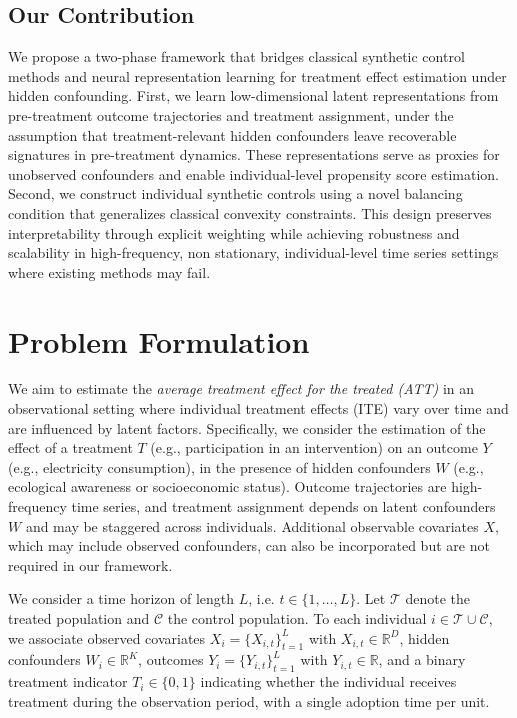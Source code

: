 \documentclass[10pt]{article} %
\begin{document}
\subsection{Our Contribution}
We propose a two-phase framework that bridges classical synthetic control methods and neural representation learning for treatment effect estimation under hidden confounding. First, we learn low-dimensional latent representations from pre-treatment outcome trajectories and treatment assignment, {under the assumption that treatment-relevant hidden confounders leave recoverable signatures in pre-treatment dynamics}. These representations serve as proxies for unobserved confounders and enable individual-level propensity score estimation. Second, we construct individual synthetic controls using a novel balancing condition that generalizes classical convexity constraints. This design preserves interpretability through explicit weighting while achieving robustness and scalability in high-frequency, non stationary, individual-level time series settings where existing methods may fail.


\section{Problem Formulation}
{
We aim to estimate the \textit{average treatment effect for the treated (ATT)} in an observational setting where individual treatment effects (ITE) vary over time and are influenced by latent factors. Specifically, we consider the estimation of the effect of a treatment $T$ (e.g., participation in an intervention) on an outcome $Y$ (e.g., electricity consumption), in the presence of hidden confounders $W$ (e.g., ecological awareness or socioeconomic status). Outcome trajectories are high-frequency time series, and treatment assignment depends on latent confounders $W$ and may be staggered across individuals. Additional observable covariates $X$, which may include observed confounders, can also be incorporated but are not required in our framework. }

{
We consider a time horizon of length $L$, i.e. $t \in \{1,\dots,L\}$. Let $\mathcal{T}$ denote the treated population and $\mathcal{C}$ the control population. To each individual $i \in \mathcal{T} \cup \mathcal{C}$, we associate observed covariates $X_i = \{X_{i,t}\}_{t=1}^{L}$ with $X_{i,t} \in \mathbb{R}^D$, hidden confounders $W_i \in \mathbb{R}^K$, outcomes $Y_i = \{Y_{i,t}\}_{t=1}^{L}$ with $Y_{i,t} \in \mathbb{R}$, and a binary treatment indicator $T_i \in \{0,1\}$ indicating whether the individual receives treatment during the observation period, with a single adoption time per unit.}
\end{document}
